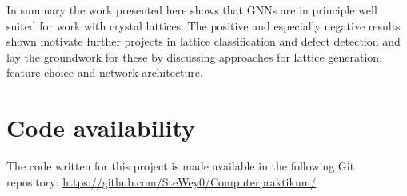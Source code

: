 \documentclass[11pt,a4paper]{article}
\begin{document}
In summary the work presented here shows that GNNs are in principle well suited for work with crystal lattices. The positive and especially negative results shown motivate further projects in lattice classification and defect detection and lay the groundwork for these by discussing approaches for lattice generation, feature choice and network architecture.


\section{Code availability}
\label{sec:Code availability}
The code written for this project is made available in the following Git repository: \url{https://github.com/SteWey0/Computerpraktikum/}


\renewcommand\refname{Bibliography}
\printbibliography[
heading=bibintoc,
title={Bibliography}
]
\end{document}
